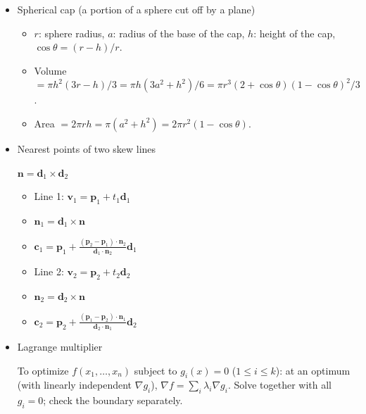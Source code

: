\begin{itemize}
\item Spherical cap (a portion of a sphere cut off by a plane)

\begin{itemize}
  \item $r$: sphere radius, $a$: radius of the base of the cap, $h$: height of the cap, $\cos\theta = (r-h)/r$.
  \item Volume $=\pi h^2(3r-h)/3=\pi h(3a^2+h^2)/6=\pi r^3(2+\cos\theta)(1-\cos\theta)^2/3$.
  \item Area $=2\pi rh=\pi(a^2+h^2)=2\pi r^2(1-\cos\theta)$.
\end{itemize}

\item Nearest points of two skew lines

$\boldsymbol{n} = \boldsymbol{d}_1 \times \boldsymbol{d}_2$

\noindent
\begin{minipage}[t]{0.47\linewidth}
\begin{itemize}
  \item Line 1: $\boldsymbol{v}_1 = \boldsymbol{p}_1 + t_1\boldsymbol{d}_1$
  \item $\boldsymbol{n}_1 = \boldsymbol{d}_1 \times \boldsymbol{n}$
  \item $\boldsymbol{c}_1 = \boldsymbol{p}_1 + \frac{(\boldsymbol{p}_2 - \boldsymbol{p}_1)\cdot\boldsymbol{n}_2}{\boldsymbol{d}_1\cdot\boldsymbol{n}_2}\boldsymbol{d}_1$
\end{itemize}
\end{minipage}\hfill
\begin{minipage}[t]{0.47\linewidth}
\begin{itemize}
  \item Line 2: $\boldsymbol{v}_2 = \boldsymbol{p}_2 + t_2\boldsymbol{d}_2$
  \item $\boldsymbol{n}_2 = \boldsymbol{d}_2 \times \boldsymbol{n}$
  \item $\boldsymbol{c}_2 = \boldsymbol{p}_2 + \frac{(\boldsymbol{p}_1 - \boldsymbol{p}_2)\cdot\boldsymbol{n}_1}{\boldsymbol{d}_2\cdot\boldsymbol{n}_1}\boldsymbol{d}_2$
\end{itemize}
\end{minipage}

\item Lagrange multiplier

To optimize $f(x_1, \ldots, x_n)$ subject to $g_i(x) = 0$ ($1 \le i \le k$): at an optimum (with linearly independent $\nabla g_i$), $\nabla f = \sum_i \lambda_i \nabla g_i$. Solve together with all $g_i = 0$; check the boundary separately.


\end{itemize}
